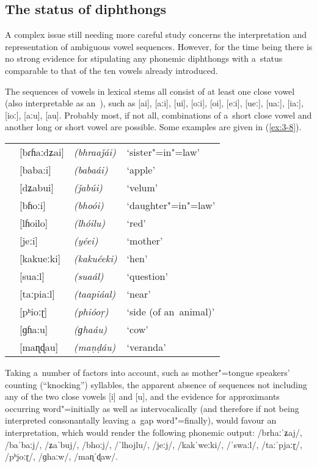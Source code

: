 \subsection{The status of diphthongs}
\label{subsec:3-2-3}

A complex issue still needing more careful study concerns the interpretation and representation of ambiguous vowel sequences. However, for the time being there is no strong evidence for stipulating any phonemic diphthongs with a~status comparable to that of the ten vowels already introduced.

The sequences of vowels in lexical stems all consist of at least one close vowel (also interpretable as an~), such as [ai], [aːi], [ui], [oːi], [oi], [eːi], [ueː], [uaː], [iaː], [ioː], [aːu], [au]. Probably most, if not all, combinations of a~short close vowel and another long or short vowel are possible. Some examples are given in (\ref{ex:3-8}).


\begin{exe}
\extab
\label{ex:3-8}
\begin{tabularx}{\textwidth}{ l l l l }
&
[bɾɦaːdʑai] &
\textit{(bhraaǰái)} &
`sister"=in"=law'\\
&
[baba:i] &
\textit{(babaái)} &
`apple'\\
&
[dʑabui] &
\textit{(ǰabúi)} &
`velum'\\
&
[bɦoːi] &
\textit{(bhoói)} &
`daughter"=in"=law'\\
&
[lɦoilo] &
\textit{(lhóilu)} &
`red'\\
&
[jeːi] &
\textit{(yéei)} &
`mother'\\
&
[kakueːki] &
\textit{(kakuéeki)} &
`hen'\\
&
[suaːl] &
\textit{(suaál)} &
`question'\\
&
[taːpiaːl] &
\textit{(taapiáal)} &
`near'\\
&
[pʰioːɽ] &
\textit{(phióoṛ)} &
`side (of an~animal)' \\
&
[ɡɦa:u] &
\textit{(ɡhaáu)} &
`cow'\\
&
[maɳɖau] &
\textit{(maṇḍáu)} &
`veranda'\\
\end{tabularx}
\end{exe}


Taking a~number of factors into account, such as mother"=tongue speakers' counting (``knocking'') syllables, the apparent absence of sequences not including any of the two close vowels [i] and [u], and the evidence for approximants occurring word"=initially as well as intervocalically (and therefore if not being interpreted consonantally leaving a~gap word"=finally), would favour an~ interpretation, which would render the following phonemic output: /brhaːˈʑaj/, /baˈbaːj/, /ʑaˈbuj/, /bhoːj/, /ˈlhojlu/, /jeːj/, /kakˈweːki/, /ˈswaːl/, /taːˈpjaːɽ/, /pʰjoːɽ/, /ɡhaːw/, /maɳˈɖaw/.


